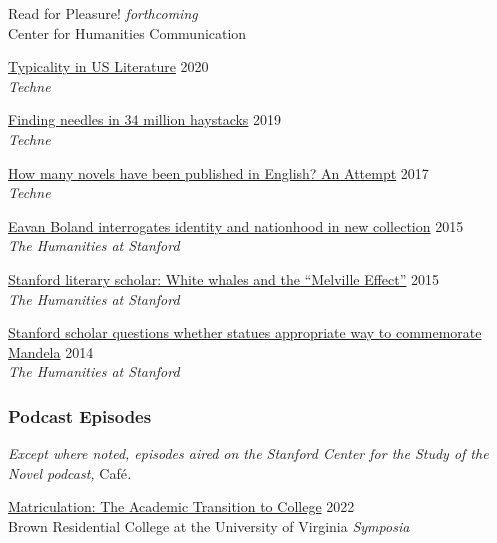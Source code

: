 \documentclass[
  12pt,
  letterpaper,
]{article}
\begin{document}
Read for Pleasure! \hfill \emph{forthcoming}\\
Center for Humanities Communication

\href{https://web.archive.org/web/20220430165427/https://litlab.stanford.edu/typicality-in-the-u-s-novel/}{Typicality
in US Literature} \hfill 2020\\
\emph{Techne}

\href{https://web.archive.org/web/20220430054802/https://litlab.stanford.edu/finding-needles-in-34-million-haystacks/}{Finding
needles in 34 million haystacks} \hfill 2019\\
\emph{Techne}

\href{https://web.archive.org/web/20220323072937/https://litlab.stanford.edu/how-many-novels-have-been-published-in-english-an-attempt/}{How
many novels have been published in English? An Attempt} \hfill 2017\\
\emph{Techne}

\href{https://web.archive.org/web/20210810123746/https://news.stanford.edu/news/2015/february/boland-country-book-022615.html}{Eavan
Boland interrogates identity and nationhood in new collection}
\hfill 2015\\
\emph{The Humanities at Stanford}

\href{https://web.archive.org/web/20210810125202/https://news.stanford.edu/news/2015/may/melville-scholar-boone-051115.html}{Stanford
literary scholar: White whales and the ``Melville Effect''}
\hfill 2015\\
\emph{The Humanities at Stanford}

\href{https://web.archive.org/web/20220611230152/https://news.stanford.edu/pr/2014/pr-mandela-statue-parker-120314.html}{Stanford
scholar questions whether statues appropriate way to commemorate
Mandela} \hfill 2014\\
\emph{The Humanities at Stanford}

\hypertarget{podcast-episodes}{%
\subsubsection{Podcast Episodes}\label{podcast-episodes}}

\emph{Except where noted, episodes aired on the Stanford Center
for the Study of the Novel podcast, }Café\emph{.}

\href{https://virginiaaudio.org/\#/symposia/}{Matriculation: The
Academic Transition to College} \hfill 2022\\
Brown Residential College at the University of
Virginia \emph{Symposia}
\end{document}
